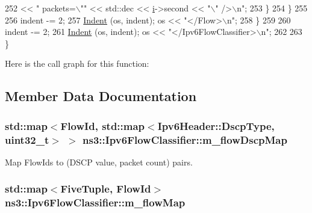 \begin{DoxyCode}
252                  << \textcolor{stringliteral}{" packets=\(\backslash\)""} << std::dec << \hyperlink{bernuolliDistribution_8m_a6f6ccfcf58b31cb6412107d9d5281426}{i}->second << \textcolor{stringliteral}{"\(\backslash\)" />\(\backslash\)n"};
253             \}
254         \}
255 
256       indent -= 2;
257       \hyperlink{classns3_1_1FlowClassifier_adc5d8694d3c9059b5ac2c664e5897088}{Indent} (os, indent); os << \textcolor{stringliteral}{"</Flow>\(\backslash\)n"};
258     \}
259 
260   indent -= 2;
261   \hyperlink{classns3_1_1FlowClassifier_adc5d8694d3c9059b5ac2c664e5897088}{Indent} (os, indent); os << \textcolor{stringliteral}{"</Ipv6FlowClassifier>\(\backslash\)n"};
262 
263 \}
\end{DoxyCode}


Here is the call graph for this function\+:




\subsection{Member Data Documentation}
\subsubsection[{\texorpdfstring{m\+\_\+flow\+Dscp\+Map}{m_flowDscpMap}}]{\setlength{\rightskip}{0pt plus 5cm}std\+::map$<${\bf Flow\+Id}, std\+::map$<${\bf Ipv6\+Header\+::\+Dscp\+Type}, uint32\+\_\+t$>$ $>$ ns3\+::\+Ipv6\+Flow\+Classifier\+::m\+\_\+flow\+Dscp\+Map\hspace{0.3cm}{\ttfamily [private]}}\hypertarget{classns3_1_1Ipv6FlowClassifier_ae351d1b8e71e5253d34cfb3e7ee3ec2a}{}\label{classns3_1_1Ipv6FlowClassifier_ae351d1b8e71e5253d34cfb3e7ee3ec2a}


Map Flow\+Ids to (D\+S\+CP value, packet count) pairs. 

\subsubsection[{\texorpdfstring{m\+\_\+flow\+Map}{m_flowMap}}]{\setlength{\rightskip}{0pt plus 5cm}std\+::map$<${\bf Five\+Tuple}, {\bf Flow\+Id}$>$ ns3\+::\+Ipv6\+Flow\+Classifier\+::m\+\_\+flow\+Map\hspace{0.3cm}{\ttfamily [private]}}\hypertarget{classns3_1_1Ipv6FlowClassifier_a2ba466f42f102ab81aed0d5cffde57a1}{}\label{classns3_1_1Ipv6FlowClassifier_a2ba466f42f102ab81aed0d5cffde57a1}


